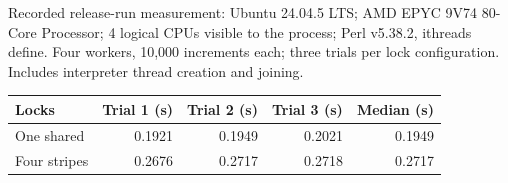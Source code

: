Recorded release-run measurement: Ubuntu 24.04.5 LTS; AMD EPYC 9V74 80-Core Processor; 4 logical CPUs visible to the process; Perl v5.38.2, ithreads define. Four workers, 10,000 increments each; three trials per lock configuration. Includes interpreter thread creation and joining.
\begin{center}\small
\begin{tabular}{lrrrr}\toprule Locks & Trial 1 (s) & Trial 2 (s) & Trial 3 (s) & Median (s)\\ \midrule
One shared & 0.1921 & 0.1949 & 0.2021 & 0.1949\\
Four stripes & 0.2676 & 0.2717 & 0.2718 & 0.2717\\
\bottomrule\end{tabular}
\end{center}
